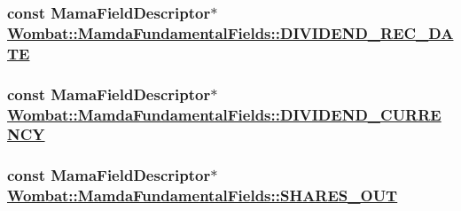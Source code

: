 \hypertarget{classWombat_1_1MamdaFundamentalFields_cdc497879c159945eb0e762c409d666e}{
\subsubsection[DIVIDEND\_\-REC\_\-DATE]{\setlength{\rightskip}{0pt plus 5cm}const Mama\-Field\-Descriptor$\ast$ \hyperlink{classWombat_1_1MamdaFundamentalFields_cdc497879c159945eb0e762c409d666e}{Wombat::Mamda\-Fundamental\-Fields::DIVIDEND\_\-REC\_\-DATE}}}
\label{classWombat_1_1MamdaFundamentalFields_cdc497879c159945eb0e762c409d666e}


\hypertarget{classWombat_1_1MamdaFundamentalFields_e214bf94f28c6227ba2c75bdf0d020ec}{
\subsubsection[DIVIDEND\_\-CURRENCY]{\setlength{\rightskip}{0pt plus 5cm}const Mama\-Field\-Descriptor$\ast$ \hyperlink{classWombat_1_1MamdaFundamentalFields_e214bf94f28c6227ba2c75bdf0d020ec}{Wombat::Mamda\-Fundamental\-Fields::DIVIDEND\_\-CURRENCY}}}
\label{classWombat_1_1MamdaFundamentalFields_e214bf94f28c6227ba2c75bdf0d020ec}


\hypertarget{classWombat_1_1MamdaFundamentalFields_6633523c2cab42a937403a058aeab933}{
\subsubsection[SHARES\_\-OUT]{\setlength{\rightskip}{0pt plus 5cm}const Mama\-Field\-Descriptor$\ast$ \hyperlink{classWombat_1_1MamdaFundamentalFields_6633523c2cab42a937403a058aeab933}{Wombat::Mamda\-Fundamental\-Fields::SHARES\_\-OUT}}}
\label{classWombat_1_1MamdaFundamentalFields_6633523c2cab42a937403a058aeab933}


